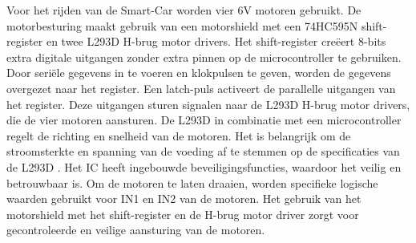Voor het rijden van de \gls{Smart-Car} worden vier 6V motoren gebruikt. De motorbesturing maakt gebruik van een \gls{motorshield} met een 74HC595N\cite{shiftregister} \gls{shift-register} en twee L293D\cite{h-brug} \gls{H-brug} motor drivers. Het \gls{shift-register} creëert 8-bits extra digitale uitgangen zonder extra pinnen op de microcontroller te gebruiken. Door seriële gegevens in te voeren en klokpulsen te geven, worden de gegevens overgezet naar het register. Een latch-puls activeert de parallelle uitgangen van het register. Deze uitgangen sturen signalen naar de L293D\cite{h-brug}  H-brug motor drivers, die de vier motoren aansturen. De L293D\cite{h-brug}  in combinatie met een microcontroller regelt de richting en snelheid van de motoren. Het is belangrijk om de stroomsterkte en spanning van de voeding af te stemmen op de specificaties van de L293D\cite{h-brug} . Het IC heeft ingebouwde beveiligingsfuncties, waardoor het veilig en betrouwbaar is. Om de motoren te laten draaien, worden specifieke logische waarden gebruikt voor IN1 en IN2 van de motoren. Het gebruik van het motorshield met het shift-register en de H-brug motor driver zorgt voor gecontroleerde en veilige aansturing van de motoren.




